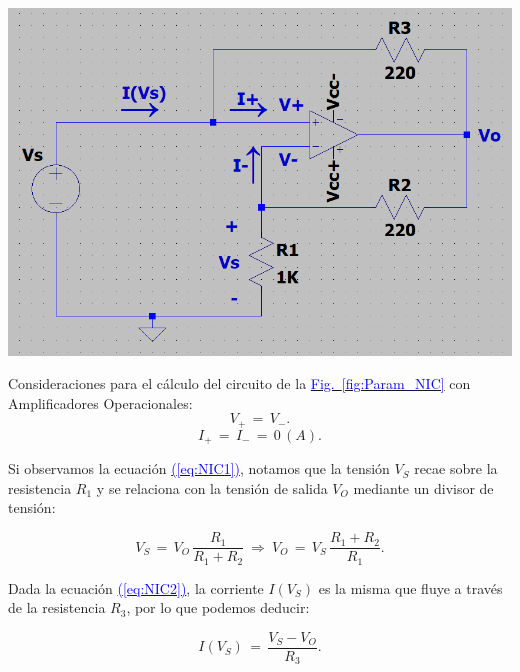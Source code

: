 \documentclass[12pt,a4paper]{report} %
\newcommand{\fref}[1]{\hyperref[#1]{\textcolor{blue}{Fig.~\ref*{#1}}}}
\newcommand{\eref}[1]{\hyperref[#1]{\textcolor{blue}{(\ref*{#1})}}}
\newcommand{\fref}[1]{\hyperref[#1]{\textcolor{blue}{\textit{Fig.~\ref*{#1}}}}}
\newcommand{\eref}[1]{\hyperref[#1]{\textcolor{blue}{\textit{(\ref*{#1})}}}}
\begin{document}
	\begin{center}
	\begin{multicols}{2}
		\centering
		\includegraphics[width=\columnwidth]{demotracion_NIC.png}
		\label{fig:Param_NIC}
	
		\columnbreak
		
		Consideraciones para el cálculo del circuito de la \fref{fig:Param_NIC} con Amplificadores Operacionales:\\
		\begin{equation}
			V_+\,=\,V_-.
			\label{eq:NIC1}
		\end{equation}
		\begin{equation}
			I_+\,=\,I_-\,=\,0\,(A).
			\label{eq:NIC2}
		\end{equation}
	\end{multicols}
	\end{center}
	
	\noindent Si observamos la ecuación \eref{eq:NIC1}, notamos que la tensión $V_S$ recae sobre la resistencia $R_1$ y se relaciona con la tensión de salida $V_O$ mediante un divisor de tensión:
	
	\begin{equation}
		V_S\,=\,V_O\,\frac{R_1}{R_1 + R_2}\:\Longrightarrow\:V_O\,=\,V_S\,\frac{R_1 + R_2}{R_1}.
		\label{eq:NIC3}
	\end{equation}\smallskip
	
	\noindent Dada la ecuación \eref{eq:NIC2}, la corriente $I(V_S)$ es la misma que fluye a través de la resistencia $R_3$, por lo que podemos deducir:
	
	\begin{equation}
		I(V_S)\,=\,\frac{V_S - V_O}{R_3}.
		\label{eq:NIC4}
	\end{equation}\smallskip
	
\end{document}
